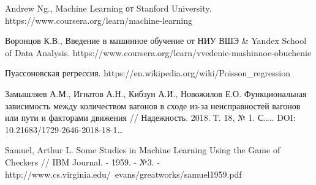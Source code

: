 \begin{thebibliography}{00}
    
     Andrew Ng., Machine Learning от Stanford University. https://www.coursera.org/learn/machine-learning
    
     Воронцов К.В., Введение в машинное обучение от НИУ ВШЭ \& Yandex School of Data Analysis. https://www.coursera.org/learn/vvedenie-mashinnoe-obuchenie
    
     Пуассоновская регрессия. https://en.wikipedia.org/wiki/Poisson\_regression
    
     Замышляев А.М., Игнатов А.Н., Кибзун А.И., Новожилов Е.О. Функциональная зависимость между количеством вагонов в сходе из-за неисправностей вагонов или пути и факторами движения // Надежность. 2018. Т. 18, № 1. С….. DOI: 10.21683/1729-2646-2018-18-1…
    
     Samuel, Arthur L. Some Studies in Machine Learning Using the Game of Checkers // IBM Journal. - 1959. - №3. - http://www.cs.virginia.edu/~evans/greatworks/samuel1959.pdf
    
\end{thebibliography}
